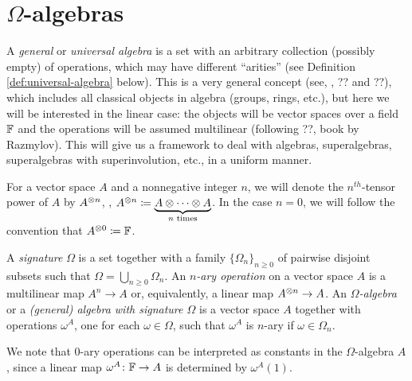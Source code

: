 
\section{\texorpdfstring{$\Omega$}{Omega}-algebras}\label{sec:Omega-algebras}

A \emph{general} or \emph{universal algebra} is a set with an arbitrary collection (possibly empty) of operations, which may have different ``arities'' (see Definition \ref{def:universal-algebra} below).
This is a very general concept (see, \eg, ?? and ??), which includes all classical objects in algebra (groups, rings, etc.), but here we will be interested in the linear case: the objects will be vector spaces over a field $\mathbb{F}$ and the operations will be assumed multilinear (following ??, book by Razmylov).
This will give us a framework to deal with algebras, superalgebras, superalgebras with superinvolution, etc., in a uniform manner.

\begin{notation}
	For a vector space $A$ and a nonnegative integer $n$, we will denote the $n^{th}$-tensor power of $A$ by $A^{\otimes n}$, \ie,
	$A^{\otimes n} \coloneqq \underbrace{A\otimes\cdots\otimes A}_{n \text{ times}}$.
	In the case $n = 0$, we will follow the convention that $A^{\otimes 0} \coloneqq \mathbb{F}$.
\end{notation}

\begin{defi}\label{def:universal-algebra}
	A \emph{signature} $\Omega$ is a set together with a family $\{ \Omega_n \}_{n \geq 0}$ of pairwise disjoint subsets such that $\Omega = \bigcup_{n \geq 0} \Omega_n$.
	An \emph{$n$-ary operation} on a vector space $A$ is a multilinear map $A^n \to A$ or, equivalently, a linear map $A^{\otimes n} \to A$.
	An \emph{$\Omega$-algebra} or a \emph{(general) algebra with signature $\Omega$} is a vector space $A$ together with operations $\omega^A$, one for each $\omega \in \Omega$, such that $\omega^A$ is $n$-ary if $\omega \in \Omega_n$.
\end{defi}

We note that $0$-ary operations can be interpreted as constants in the $\Omega$-algebra $A$, since a linear map $\omega^A\colon \mathbb{F} \to A$ is determined by $\omega^A(1)$.

